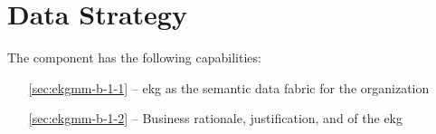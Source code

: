 \chapter{Data Strategy}\label{ch:ekgmm-b-1} %

The  component has the following capabilities:

\begin{itemize}[leftmargin=.5in]
    \item [\ref{sec:ekgmm-b-1-1}]  -- \gls{ekg} as the semantic data fabric for the organization
    \item [\ref{sec:ekgmm-b-1-2}]  -- Business rationale, justification, and  of the \gls{ekg}
\end{itemize}


